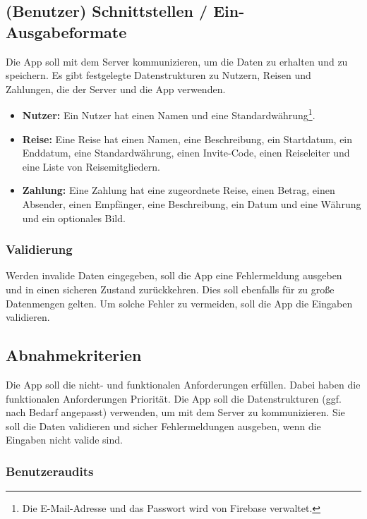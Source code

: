 \subsection{(Benutzer) Schnittstellen / Ein-Ausgabeformate}

Die App soll mit dem Server kommunizieren, um die Daten zu erhalten und zu speichern.
Es gibt festgelegte Datenstrukturen zu Nutzern, Reisen und Zahlungen, die der Server und die App verwenden.

\begin{itemize}
	\item \textbf{Nutzer:} Ein Nutzer hat einen Namen und eine Standardwährung\footnote{Die E-Mail-Adresse und das Passwort wird von Firebase verwaltet.}.
	\item \textbf{Reise:} Eine Reise hat einen Namen, eine Beschreibung, ein Startdatum, ein Enddatum, eine Standardwährung, einen Invite-Code, einen Reiseleiter und eine Liste von Reisemitgliedern.
	\item \textbf{Zahlung:} Eine Zahlung hat eine zugeordnete Reise, einen Betrag, einen Absender, einen Empfänger, eine Beschreibung, ein Datum und eine Währung und ein optionales Bild.
\end{itemize}

\subsubsection{Validierung}

Werden invalide Daten eingegeben, soll die App eine Fehlermeldung ausgeben und in einen sicheren Zustand zurückkehren.
Dies soll ebenfalls für zu große Datenmengen gelten.
Um solche Fehler zu vermeiden, soll die App die Eingaben validieren.

\subsection{Abnahmekriterien}

Die App soll die nicht- und funktionalen Anforderungen erfüllen.
Dabei haben die funktionalen Anforderungen Priorität.
Die App soll die Datenstrukturen (ggf. nach Bedarf angepasst) verwenden, um mit dem Server zu kommunizieren.
Sie soll die Daten validieren und sicher Fehlermeldungen ausgeben, wenn die Eingaben nicht valide sind.

\subsubsection{Benutzeraudits}

